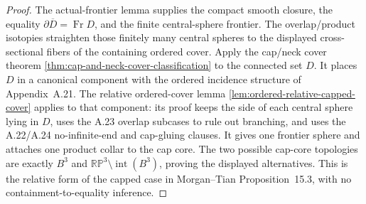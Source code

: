 \begin{proof}
The actual-frontier lemma supplies the compact smooth closure, the equality
\(\partial\overline D=\operatorname{Fr}D\), and the finite central-sphere
frontier.  The overlap/product isotopies straighten those finitely many
central spheres to the displayed cross-sectional fibers of the containing
ordered cover.  Apply the cap/neck cover theorem
\ref{thm:cap-and-neck-cover-classification} to the connected set $D$.
It places $D$ in a canonical component with the ordered incidence structure
of Appendix~A.21.  The relative ordered-cover lemma
\ref{lem:ordered-relative-capped-cover} applies to that component: its proof
keeps the side of each central sphere lying in $D$, uses the A.23 overlap
subcases to rule out branching, and uses the A.22/A.24 no-infinite-end and
cap-gluing clauses.  It gives one frontier sphere and attaches one product
collar to the cap core.  The two possible cap-core topologies are exactly
$B^3$ and $\mathbb{RP}^3\setminus\operatorname{int}(B^3)$, proving the
displayed alternatives.  This is the relative form of the capped case in
Morgan--Tian Proposition~15.3, with no containment-to-equality inference.
\end{proof}

